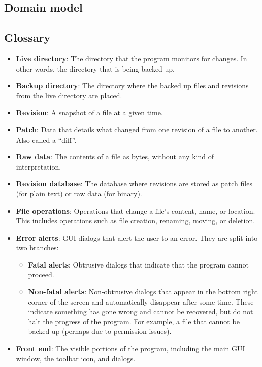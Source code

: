 \documentclass[12pt,a4paper]{article}
\newcommand\todonote[1]{\noindent{\color{red}\fbox{\parbox{\dimexpr\linewidth-2\fboxsep-2\fboxrule}{\textit\large{\textbf{TODO: #1}}}}}}
\begin{document}
\subsection{Domain model}
\todonote{This one's Michael's}

\subsection{Glossary}
\begin{itemize}
\item \textbf{Live directory}: The directory that the program monitors for changes. In other words, the directory that is being backed up.
\item \textbf{Backup directory}: The directory where the backed up files and revisions from the live directory are placed.
\item \textbf{Revision}: A snapshot of a file at a given time.
\item \textbf{Patch}: Data that details what changed from one revision of a file to another. Also called a ``diff''.
\item \textbf{Raw data}: The contents of a file as bytes, without any kind of interpretation.
\item \textbf{Revision database}: The database where revisions are stored as patch files (for plain text) or raw data (for binary).
\item \textbf{File operations}: Operations that change a file's content, name, or location. This includes operations such as file creation, renaming, moving, or deletion.
\item \textbf{Error alerts}: GUI dialogs that alert the user to an error. They are split into two branches:
	\begin{itemize}
	\item \textbf{Fatal alerts}: Obtrusive dialogs that indicate that the program cannot proceed.
	\item \textbf{Non-fatal alerts}: Non-obtrusive dialogs that appear in the bottom right corner of the screen and automatically disappear after some time. These indicate something has gone wrong and cannot be recovered, but do not halt the progress of the program. For example, a file that cannot be backed up (perhaps due to permission issues).
	\end{itemize}
\item \textbf{Front end}: The visible portions of the program, including the main GUI window, the toolbar icon, and dialogs.
	\begin{itemize}

\end{itemize}
\end{itemize}
\end{document}
